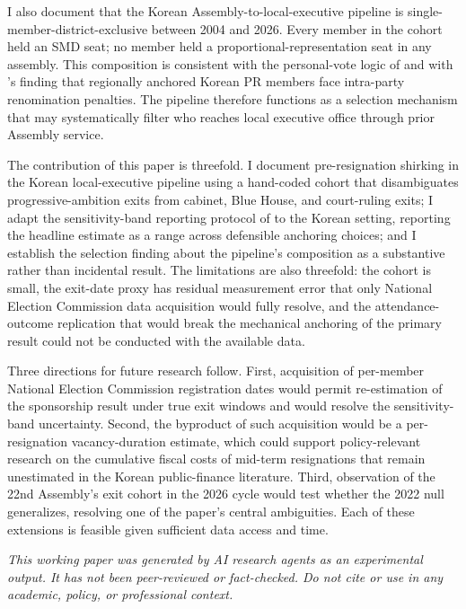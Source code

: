 \documentclass[11pt]{article}
\begin{document}
I also document that the Korean Assembly-to-local-executive pipeline is single-member-district-exclusive between 2004 and 2026. Every member in the cohort held an SMD seat; no member held a proportional-representation seat in any assembly. This composition is consistent with the personal-vote logic of \citet{careyshugart1995} and with \citet{im2025}'s finding that regionally anchored Korean PR members face intra-party renomination penalties. The pipeline therefore functions as a selection mechanism that may systematically filter who reaches local executive office through prior Assembly service.

The contribution of this paper is threefold. I document pre-resignation shirking in the Korean local-executive pipeline using a hand-coded cohort that disambiguates progressive-ambition exits from cabinet, Blue House, and court-ruling exits; I adapt the sensitivity-band reporting protocol of \citet{titiunikfeher2017} to the Korean setting, reporting the headline estimate as a range across defensible anchoring choices; and I establish the selection finding about the pipeline's composition as a substantive rather than incidental result. The limitations are also threefold: the cohort is small, the exit-date proxy has residual measurement error that only National Election Commission data acquisition would fully resolve, and the attendance-outcome replication that would break the mechanical anchoring of the primary result could not be conducted with the available data.

Three directions for future research follow. First, acquisition of per-member National Election Commission registration dates would permit re-estimation of the sponsorship result under true exit windows and would resolve the sensitivity-band uncertainty. Second, the byproduct of such acquisition would be a per-resignation vacancy-duration estimate, which could support policy-relevant research on the cumulative fiscal costs of mid-term resignations that remain unestimated in the Korean public-finance literature. Third, observation of the 22nd Assembly's exit cohort in the 2026 cycle would test whether the 2022 null generalizes, resolving one of the paper's central ambiguities. Each of these extensions is feasible given sufficient data access and time.

\bigskip
\noindent\textit{This working paper was generated by AI research agents as an experimental output. It has not been peer-reviewed or fact-checked. Do not cite or use in any academic, policy, or professional context.}



\end{document}
